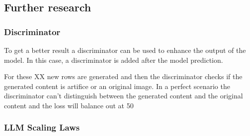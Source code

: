 


    

\subsection{Further research}

    \subsubsection{Discriminator}
    To get a better result a discriminator can be used to enhance the output of the model. In this case, a discriminator is added after the model prediction.

    For these XX new rows are generated and then the discriminator checks if the generated content is artifice or an original image. In a perfect scenario the discriminator can't distinguish between the generated content and the original content and the loss will balance out at 50

    \subsubsection{LLM Scaling Laws}
